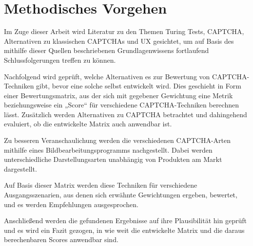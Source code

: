 \chapter{Methodisches Vorgehen}
Im Zuge dieser Arbeit wird Literatur zu den Themen Turing Tests, CAPTCHA, Alternativen zu klassischen CAPTCHAs und UX gesichtet, 
um auf Basis des mithilfe dieser Quellen beschriebenen Grundlagenwissens fortlaufend Schlussfolgerungen treffen zu können. 

Nachfolgend wird geprüft, welche Alternativen es zur Bewertung von CAPTCHA-Techniken gibt, bevor eine solche selbst entwickelt wird. 
Dies geschieht in Form einer Bewertungsmatrix, aus der sich mit gegebener Gewichtung eine Metrik beziehungsweise ein „Score“ für verschiedene CAPTCHA-Techniken berechnen lässt. 
Zusätzlich werden Alternativen zu CAPTCHA betrachtet und dahingehend evaluiert, ob die entwickelte Matrix auch anwendbar ist.

Zu besseren Veranschaulichung werden die verschiedenen CAPTCHA-Arten mithilfe eines Bildbearbeitungsprogramms nachgestellt. 
Dabei werden unterschiedliche Darstellungsarten unabhängig von Produkten am Markt dargestellt.

Auf Basis dieser Matrix werden diese Techniken für verschiedene Ausgangsszenarien, 
aus denen sich erwähnte Gewichtungen ergeben, bewertet, und es werden Empfehlungen ausgesprochen.

Anschließend werden die gefundenen Ergebnisse auf ihre Plausibilität hin geprüft und es wird ein Fazit gezogen, 
in wie weit die entwickelte Matrix und die daraus berechenbaren Scores anwendbar sind.
  
